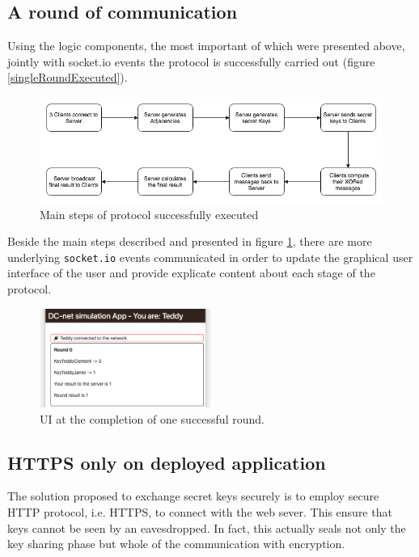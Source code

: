 \subsection{A round of communication}
Using the logic components, the most important of which were presented above, jointly with socket.io events the protocol is successfully carried out (figure \ref{singleRoundExecuted}).

\begin{figure}[H]
    \centering
    \includegraphics[width=1\textwidth]{Images/Implementation/protocolExecuted.png}
    \caption{Main steps of protocol successfully executed}
    \label{fig:protocolExecuted}
\end{figure}

Beside the main steps described and presented in figure \ref{fig:protocolExecuted}, there are more underlying \lstinline{socket.io} events communicated in order to update the graphical user interface of the user and provide explicate content about each stage of the protocol.

\begin{figure}[H]
    \centering
    \includegraphics[width=0.5\textwidth]{Images/Implementation/singleRoundExecuted.png}
    \caption{UI at the completion of one successful round.}
    \label{fig:singleRoundExecuted}
\end{figure}


\subsection{HTTPS only on deployed application}
The solution proposed to exchange secret keys securely is to employ secure HTTP protocol, i.e. HTTPS, to connect with the web sever. This ensure that keys cannot be seen by an eavesdropped. In fact, this actually seals not only the key sharing phase but whole of the communication with encryption.

